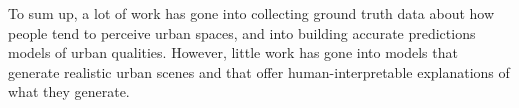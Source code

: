 \vspace{4pt}
To sum up, a lot of work has gone into collecting ground truth data about how people tend to perceive urban spaces, and into building accurate predictions models of urban qualities. However,  little work has gone into models that generate realistic urban scenes and that offer human-interpretable explanations of what they generate. 


